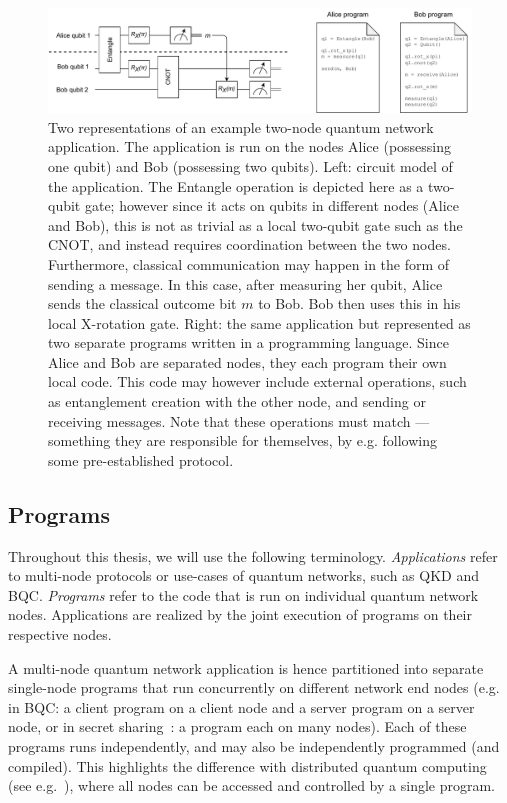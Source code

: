 \begin{figure}[t]
    \centering
    \includegraphics[width=1.0\linewidth]{figures/background/2node_circuit.pdf}
    \caption{
        Two representations of an example two-node quantum network application.
        The application is run on the nodes Alice (possessing one qubit) and Bob (possessing two qubits).
        Left: circuit model of the application.
        The Entangle operation is depicted here as a two-qubit gate; however since it acts on qubits in different nodes (Alice and Bob),
        this is not as trivial as a local two-qubit gate such as the CNOT, and instead requires coordination between the two nodes.
        Furthermore, classical communication may happen in the form of sending a message.
        In this case, after measuring her qubit, Alice sends the classical outcome bit $m$ to Bob.
        Bob then uses this in his local X-rotation gate.
        Right: the same application but represented as two separate programs written in a programming language.
        Since Alice and Bob are separated nodes, they each program their own local code.
        This code may however include external operations, such as entanglement creation with the other node, and sending or receiving messages.
        Note that these operations must match --- something they are responsible for themselves, by e.g. following some pre-established protocol.
    }
    \label{background:fig:2node_circuit}
\end{figure}


\subsection{Programs}
Throughout this thesis, we will use the following terminology.
\emph{Applications} refer to multi-node protocols or use-cases of quantum networks, such as QKD and BQC.
\emph{Programs} refer to the code that is run on individual quantum network nodes.
Applications are realized by the joint execution of programs on their respective nodes.

A multi-node quantum network application is hence partitioned into separate single-node programs that run concurrently on different network end nodes (e.g. in BQC: a client program on a client node and a server program on a server node, or in secret sharing~\cite{hillery1999quantum}: a program each on many nodes).
Each of these programs runs independently, and may also be independently programmed (and compiled).
This highlights the difference with distributed quantum computing (see e.g.~\cite{cacciapuoti2019quantum}), where all nodes can be accessed and controlled by a single program. 



